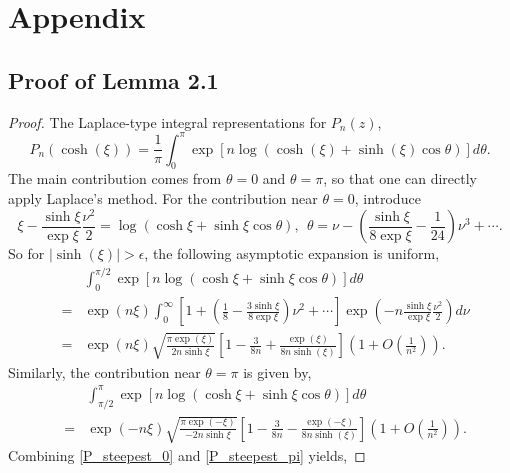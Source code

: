 \documentclass[11pt]{article}
\begin{document}
\section{Appendix}

\subsection{Proof of Lemma 2.1}
\begin{proof}
The Laplace-type integral representations for  $P_n(z)$,
\begin{equation}
    P_n(\cosh(\xi)) = \frac{1}{\pi} \int_0^\pi \exp \left[n \log\left(\cosh(\xi) + \sinh(\xi) \cos \theta \right)\right] d\theta. \label{P_laplace_integral}
\end{equation}
The main contribution comes from $\theta =0$ and $\theta =\pi$, so that one can directly apply Laplace's method. For the contribution near $\theta =0$, introduce 
\begin{equation}
\xi - \frac{\sinh \xi}{\exp \xi} \frac{\nu^2}{2} = \log(\cosh \xi + \sinh \xi \cos\theta ),\ \  \theta = \nu - \left(\frac{\sinh \xi}{8\exp \xi} - \frac{1}{24}\right)\nu^3 + \cdots.
\end{equation} 
So for $|\sinh(\xi)| > \epsilon$, the following asymptotic expansion is uniform,
\begin{eqnarray}
    && \int_0^{\pi/2} \exp \left[n\log(\cosh \xi + \sinh \xi \cos\theta ) \right] d\theta \nonumber\\
    &=& \exp \left(n\xi  \right)\int_0^{\infty} \left[1 + \left(\frac{1}{8} - \frac{3\sinh \xi}{8\exp \xi} \right)\nu^2 + \cdots \right] \exp \left( - n\frac{\sinh \xi}{\exp \xi} \frac{\nu^2}{2} \right) d\nu \nonumber\\
    &=& \exp \left(n\xi  \right) \sqrt{\frac{\pi \exp(\xi)}{2n \sinh \xi}} \left[1 - \frac{3}{8n} + \frac{\exp(\xi)}{8n \sinh(\xi)}\right] \left( 1 + O(\frac{1}{n^2}) \right).\label{P_steepest_0}
\end{eqnarray}
Similarly, the contribution near $\theta = \pi$ is given by,
\begin{eqnarray}
    && \int_{\pi/2}^\pi \exp \left[n\log(\cosh \xi + \sinh \xi \cos\theta ) \right] d\theta \nonumber\\
    &=& \exp \left(-n\xi  \right) \sqrt{\frac{\pi \exp(-\xi)}{-2n \sinh \xi}} \left[1 - \frac{3}{8n} - \frac{\exp(-\xi)}{8n \sinh(\xi)} \right] \left( 1 + O(\frac{1}{n^2}) \right).\label{P_steepest_pi}
\end{eqnarray}
Combining \eqref{P_steepest_0} and \eqref{P_steepest_pi} yields,

\end{proof}
\end{document}
